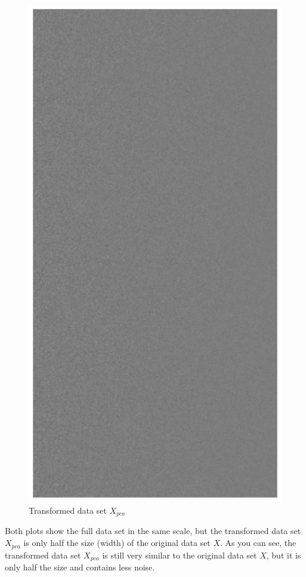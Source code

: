 \begin{figure}
\begin{minipage}[t]{.45\textwidth}
    \includegraphics[width=.95\textwidth]{images/pca-2.eps}
    \caption{Transformed data set $X_{pca}$}
    \label{fig:pca-2}
\end{minipage}
\end{figure}

Both plots show the full data set in the same scale, but the transformed data set $X_{pca}$ is only half the size (width) of the original data set $X$.
As you can see, the transformed data set $X_{pca}$ is still very similar to the original data set $X$, but it is only half the size and contains less noise.

